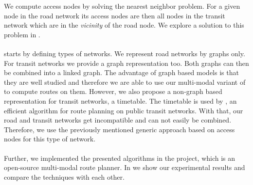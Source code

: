 	We compute access nodes by solving the nearest neighbor problem. For a given node in the road network its access
	nodes are then all nodes in the transit network which are in the \textit{vicinity} of the road node. We explore a solution
	to this problem in .\\\\
	 starts by defining types of networks. We represent road networks by graphs only.
	For transit networks we provide a graph representation too. Both graphs can then be combined into a linked graph.
	The advantage of graph based models is that they are well studied and therefore we are able to use our
	multi-modal variant of \dijkstra to compute routes on them.
	However, we also propose a non-graph based representation for transit networks, a timetable. The timetable is used by \csa,
	an efficient algorithm for route planning on public transit networks. With that, our road and transit networks get incompatible
	and can not easily be combined. Therefore, we use the previously mentioned generic approach based on access nodes
	for this type of network.\\\\
	Further, we implemented the presented algorithms in the \cobweb project, which is an open-source multi-modal route planner.
	In  we show our experimental results and compare the techniques with each other.